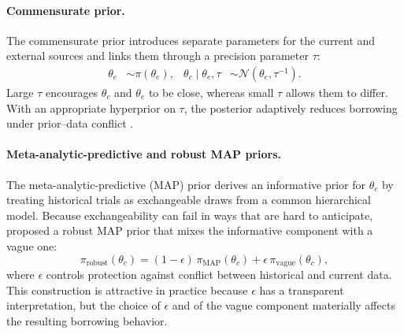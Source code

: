 \paragraph{Commensurate prior.}
The commensurate prior \citep{hobbs2011commensurate,hobbs2012commensurate}
introduces separate parameters for the current and external sources and
links them through a precision parameter $\tau$:
\begin{align}
\theta_e &\sim \pi(\theta_e), &
\theta_c \mid \theta_e, \tau &\sim \mathcal{N}(\theta_e,\tau^{-1}).
\end{align}
Large $\tau$ encourages $\theta_c$ and $\theta_e$ to be close, whereas small
$\tau$ allows them to differ.
With an appropriate hyperprior on $\tau$, the posterior adaptively reduces
borrowing under prior--data conflict \citep{evans2006checking,
presanis2013conflict}.

\paragraph{Meta-analytic-predictive and robust MAP priors.}
The meta-analytic-predictive (MAP) prior
\citep{neuenschwander2010summarizing} derives an informative prior for
$\theta_c$ by treating historical trials as exchangeable draws from a common
hierarchical model.
Because exchangeability can fail in ways that are hard to anticipate,
\citet{schmidli2014robust} proposed a robust MAP prior that mixes the
informative component with a vague one:
\begin{equation}
\pi_{\text{robust}}(\theta_c)
=
(1-\epsilon)\,\pi_{\text{MAP}}(\theta_c)
+
\epsilon\,\pi_{\text{vague}}(\theta_c),
\end{equation}
where $\epsilon$ controls protection against conflict between historical and
current data.
This construction is attractive in practice because $\epsilon$ has a
transparent interpretation, but the choice of $\epsilon$ and of the vague
component materially affects the resulting borrowing behavior.

